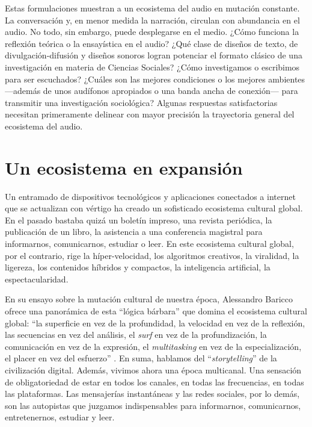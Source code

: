 \documentclass[
  spanish,
  11pt,
  a4paper,
]{scrbook}
\begin{document}
Estas formulaciones muestran a un ecosistema del audio en mutación
constante. La conversación y, en menor medida la narración, circulan con
abundancia en el audio. No todo, sin embargo, puede desplegarse en el
medio. ¿Cómo funciona la reflexión teórica o la ensayística en el audio?
¿Qué clase de diseños de texto, de divulgación-difusión y diseños
sonoros logran potenciar el formato clásico de una investigación en
materia de Ciencias Sociales? ¿Cómo investigamos o escribimos para ser
escuchados? ¿Cuáles son las mejores condiciones o los mejores ambientes
---además de unos audífonos apropiados o una banda ancha de conexión---
para transmitir una investigación sociológica? Algunas respuestas
satisfactorias necesitan primeramente delinear con mayor precisión la
trayectoria general del ecosistema del audio.

\section*{Un ecosistema en
expansión}\label{un-ecosistema-en-expansiuxf3n}


Un entramado de dispositivos tecnológicos y aplicaciones conectados a
internet que se actualizan con vértigo ha creado un sofisticado
ecosistema cultural global. En el pasado bastaba quizá un boletín
impreso, una revista periódica, la publicación de un libro, la
asistencia a una conferencia magistral para informarnos, comunicarnos,
estudiar o leer. En este ecosistema cultural global, por el contrario,
rige la híper-velocidad, los algoritmos creativos, la viralidad, la
ligereza, los contenidos híbridos y compactos, la inteligencia
artificial, la espectacularidad.

En su ensayo sobre la mutación cultural de nuestra época, Alessandro
Baricco ofrece una panorámica de esta ``lógica bárbara'' que domina el
ecosistema cultural global: ``la superficie en vez de la profundidad, la
velocidad en vez de la reflexión, las secuencias en vez del análisis, el
\emph{surf} en vez de la profundización, la comunicación en vez de la
expresión, el \emph{multitasking} en vez de la especialización, el
placer en vez del esfuerzo'' \autocite[epílogo]{Baricco2006}. En suma,
hablamos del ``\emph{storytelling}'' de la civilización digital. Además,
vivimos ahora una época multicanal. Una sensación de obligatoriedad de
estar en todos los canales, en todas las frecuencias, en todas las
plataformas. Las mensajerías instantáneas y las redes sociales, por lo
demás, son las autopistas que juzgamos indispensables para informarnos,
comunicarnos, entretenernos, estudiar y leer.
\end{document}
